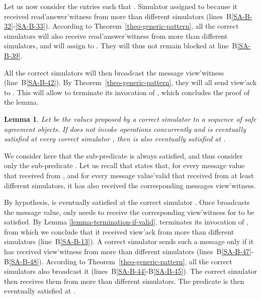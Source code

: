 \documentclass[11pt,letterpaper]{article}
\newtheorem{lemma}{Lemma}
\newlength {\afterproof}
\newcommand{\toto}{xxx}
\newenvironment{proofL}{\noindent{\bf Proof }}
{\hspace*{\fill}\par\vspace{\afterproof}}
\begin{document}
\begin{proofL}
\begin{itemize}
Let us now consider the entries  such that .
Simulator  assigned  to 
 because it received
{\sc read'answer'witness} from more than
 different simulators (lines~B\ref{SA-B-32}-\ref{SA-B-33}).
 According to 
Theorem~\ref{theo-generic-pattern}, all the correct simulators 
will also receive {\sc read'answer'witness} from more than
 different simulators, and will assign  to
. They will thus not remain blocked at line~B\ref{SA-B-39}.

All the correct simulators will then broadcast the message
{\sc view'witness} (line~B\ref{SA-B-42}).
By Theorem~\ref{theo-generic-pattern}, they will
all send {\sc view'ack} to . This will allow  to
terminate its invocation of , which concludes the
proof of the lemma.
\end{itemize}
\vspace{-0.6cm}
\renewcommand{\toto}{lemma-termination-if-valid}
\end{proofL}



\begin{lemma}
\label{lemma-valid-if-correct}
Let  be the values proposed by a correct simulator
 to a sequence of safe agreement objects. If  does not invoke
 operations concurrently and  is
eventually satisfied at every correct simulator , then
 is also eventually satisfied at .
\end{lemma}

\begin{proofL}
We  consider here that the sub-predicate  is always satisfied, and
thus consider only the sub-predicate . Let us recall that  states
that, for every message {\sc value} that  received from ,
and for every message {\sc value'valid} that  received from 
at least  different simulators, it has also
received the corresponding messages {\sc view'witness}.

By hypothesis,  is eventually satisfied at the
correct simulator . Once  broadcasts the message
{\sc value},   only needs  to receive the corresponding
{\sc view'witness} for  to be satisfied.
By Lemma \ref{lemma-termination-if-valid},  terminates its invocation
of , from which we conclude that it  received
{\sc view'ack} from more than   different simulators
(line~B\ref{SA-B-13}).
A correct simulator sends such a message only if it has received
{\sc view'witness} from more than   different
simulators (lines~B\ref{SA-B-47}-B\ref{SA-B-48}).
According to Theorem~\ref{theo-generic-pattern},
all the correct simulators  also broadcast it
(lines~B\ref{SA-B-44}-B\ref{SA-B-45}). The correct simulator   then
receives them from more than  different simulators.
The predicate  is then eventually satisfied at 
.
\renewcommand{\toto}{lemma-valid-if-correct}
\end{proofL}
\end{document}
